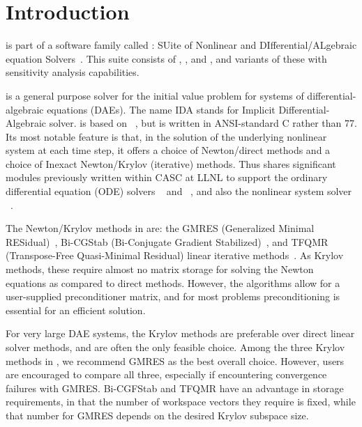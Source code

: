 \chapter{Introduction}\label{s:intro}

{\ida} is part of a software family called {\sundials}: 
SUite of Nonlinear and DIfferential/ALgebraic equation Solvers~\cite{HBGLSSW:05}. 
This suite consists of {\cvode}, {\kinsol}, and {\ida}, and variants of these
with sensitivity analysis capabilities.

{\ida} is a general purpose solver for the initial value problem for
systems of differential-algebraic equations (DAEs).  The name IDA
stands for Implicit Differential-Algebraic solver.  {\ida} is based on
{\daspk}~\cite{BHP:94,BHP:98}, but is written in ANSI-standard C
rather than {\F}77.  Its most notable feature is that, in the
solution of the underlying nonlinear system at each time step, it offers
a choice of Newton/direct methods and a choice of Inexact Newton/Krylov
(iterative) methods.  Thus {\ida} shares significant modules previously
written within CASC at LLNL to support the ordinary differential
equation (ODE) solvers {\cvode}~\cite{cvode2.4.0_ug,CoHi:96} and 
{\pvode}~\cite{ByHi:98,ByHi:99}, and also the nonlinear system solver 
{\kinsol}~\cite{kinsol2.4.0_ug}.

The Newton/Krylov methods in {\ida} are:
the GMRES (Generalized Minimal RESidual)~\cite{SaSc:86},
Bi-CGStab (Bi-Conjugate Gradient Stabilized)~\cite{Van:92}, and
TFQMR (Transpose-Free Quasi-Minimal Residual) linear iterative 
methods~\cite{Fre:93}.  As Krylov methods, these require almost no 
matrix storage for solving the Newton equations as compared to direct
methods. However, the algorithms allow for a user-supplied preconditioner
matrix, and for most problems preconditioning is essential for an
efficient solution.

For very large DAE systems, the Krylov methods are preferable over
direct linear solver methods, and are often the only feasible choice.
Among the three Krylov methods in {\ida}, we recommend GMRES as the
best overall choice.  However, users are encouraged to compare all
three, especially if encountering convergence failures with GMRES.
Bi-CGFStab and TFQMR have an advantage in storage requirements, in
that the number of workspace vectors they require is fixed, while that
number for GMRES depends on the desired Krylov subspace size.

